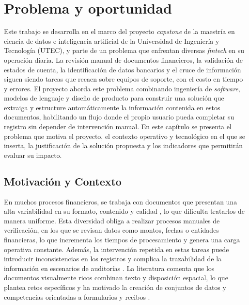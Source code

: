 \chapter{Problema y oportunidad}\label{chap:problema}

Este trabajo se desarrolla en el marco del proyecto \textit{capstone} de la maestría en ciencia de datos e inteligencia artificial de la Universidad de Ingeniería y Tecnología (UTEC), y parte de un problema que enfrentan diversas \textit{fintech} en su operación diaria. La revisión manual de documentos financieros, la validación de estados de cuenta, la identificación de datos bancarios y el cruce de información siguen siendo tareas que recaen sobre equipos de soporte, con el costo en tiempo y errores. El proyecto aborda este problema combinando ingeniería de \textit{software}, modelos de lenguaje y diseño de producto para construir una solución que extraiga y estructure automáticamente la información contenida en estos documentos, habilitando un flujo donde el propio usuario pueda completar su registro sin depender de intervención manual. En este capítulo se presenta el problema que motiva el proyecto, el contexto operativo y tecnológico en el que se inserta, la justificación de la solución propuesta y los indicadores que permitirán evaluar su impacto.


\section{Motivación y Contexto}

En muchos procesos financieros, se trabaja con documentos que presentan una alta variabilidad en su formato, contenido y calidad \cite{Zheng2023DocLevelIE, Huang2021SROIE}, lo que dificulta tratarlos de manera uniforme. Esta diversidad obliga a realizar procesos manuales de verificación, en los que se revisan datos como montos, fechas o entidades financieras, lo que incrementa los tiempos de procesamiento y genera una carga operativa constante. Además, la intervención repetida en estas tareas puede introducir inconsistencias en los registros y complica la trazabilidad de la información en escenarios de auditorías \cite{Huang2021SROIE}. La literatura comenta que los documentos visualmente ricos combinan texto y disposición espacial, lo que plantea retos específicos y ha motivado la creación de conjuntos de datos y competencias orientadas a formularios y recibos \cite{Cui2021}.

